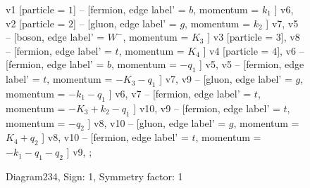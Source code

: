 \documentclass{revtex4}
\begin{document}
\begin{figure}[!htb]
\begin{center}
{    %
v1 [particle = \(1\)] -- [fermion, edge label' = \(b\), momentum = \(k_{1}\) ] v6, 
v2 [particle = \(2\)] -- [gluon, edge label' = \(g\), momentum = \(k_{2}\) ] v7, 
v5 -- [boson, edge label' = \(W^{-}\), momentum = \(K_{3}\) ] v3 [particle = \(3\)], 
v8 -- [fermion, edge label' = \(t\), momentum = \(K_{4}\) ] v4 [particle = \(4\)], 
v6 -- [fermion, edge label' = \(b\), momentum = \(-q_{1}\) ] v5, 
v5 -- [fermion, edge label' = \(t\), momentum = \(-K_{3} - q_{1}\) ] v7, 
v9 -- [gluon, edge label' = \(g\), momentum = \(-k_{1} - q_{1}\) ] v6, 
v7 -- [fermion, edge label' = \(t\), momentum = \(-K_{3} + k_{2} - q_{1}\) ] v10, 
v9 -- [fermion, edge label' = \(t\), momentum = \(-q_{2}\) ] v8, 
v10 -- [gluon, edge label' = \(g\), momentum = \(K_{4} + q_{2}\) ] v8, 
v10 -- [fermion, edge label' = \(t\), momentum = \(-k_{1} - q_{1} - q_{2}\) ] v9, 
};
\end{center}
\caption{Diagram234, Sign: 1, Symmetry factor: 1}
\end{figure}
\newpage
\end{document}
